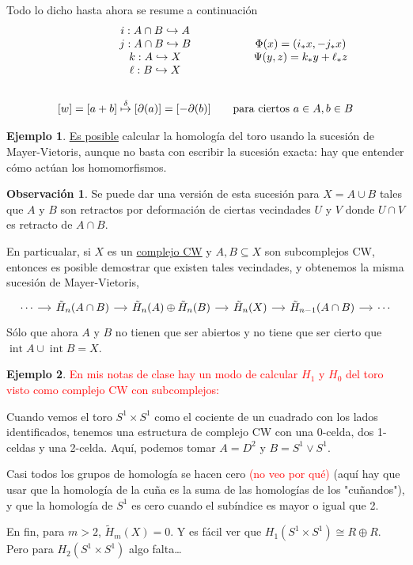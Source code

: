 \documentclass[spanish]{book}
\theoremstyle{definition}
\newtheorem*{obs}{Observación}
\newtheorem*{ejem}{Ejemplo}
\DeclareMathOperator{\Int}{int}
\begin{document}
	Todo lo dicho hasta ahora se resume a continuación
	\begin{equation*}
	\begin{aligned}
	\begin{array}{c@{\hspace{2cm}}c}
			i:A\cap B\hookrightarrow A\\
			j:A\cap B\hookrightarrow B &\Phi(x)=(i_*x,-j_*x)\\
			k:A\hookrightarrow X&\Psi(y,z)=k_*y+\ell_*z\\
			\ell:B\hookrightarrow X
	\end{array}\\ \\
	[w]=[a+b]\overset{\delta}{\mapsto}[\partial(a)]=[-\partial(b)]\qquad\text{para ciertos }a\in A,b\in B
	\end{aligned}
	\end{equation*}

	\begin{ejem}
		\href{https://math.stackexchange.com/questions/58311/the-homology-groups-of-t2-by-mayer-vietoris}{Es posible} calcular la homología del toro usando la sucesión de Mayer-Vietoris, aunque no basta con escribir la sucesión exacta: hay que entender cómo actúan los homomorfismos.
	\end{ejem}
	\begin{obs}
		Se puede dar una versión de esta sucesión para $X=A\cup B$ tales que $A$ y $B$ son retractos por deformación de ciertas vecindades $U$ y $V$ donde $U\cap V$ es retracto de $A\cap B$.
		
		En particualar, si $X$ es un \hyperref[chap:CCW]{complejo CW} y $A,B\subseteq X$ son subcomplejos CW, entonces es posible demostrar que existen tales vecindades, y obtenemos la misma sucesión de Mayer-Vietoris,
		\[\begin{tikzcd}[column sep= small]
			\cdots \arrow[r] & \tilde{H}_n(A\cap B) \arrow[r] & \tilde{H}_n(A) \oplus \tilde{H}_n(B) \arrow[r] & \tilde{H}_n(X) \arrow[r] & \tilde{H}_{n-1}(A\cap B) \arrow[r] &\cdots
		\end{tikzcd}\]
		Sólo que ahora $A$ y $B$ no tienen que ser abiertos y no tiene que ser cierto que $\Int A\cup\Int B=X$.
	\end{obs}
\begin{ejem}\label{ejem:toroCWMV}
	\textcolor{red}{En mis notas de clase hay un modo de calcular $H_1$ y $H_0$ del toro visto como complejo CW con subcomplejos:}
	
	Cuando vemos el toro $S^1\times S^1$ como el cociente de un cuadrado con los lados identificados, tenemos una estructura de complejo CW con una 0-celda, dos 1-celdas y una 2-celda. Aquí, podemos tomar $A=D^2$ y $B=S^1\vee S^1$.
	
	Casi todos los grupos de homología se hacen cero \textcolor{red}{(no veo por qué)} (aquí hay que usar que la homología de la cuña es la suma de las homologías de los "cuñandos"), y que la homología de $S^1$ es cero cuando el subíndice es mayor o igual que 2.
	
	En fin, para $m>2$, $\tilde H_m(X)=0$. Y es fácil ver que $H_1(S^1\times S^1)\cong R\oplus R$. Pero para $H_2(S^1\times S^1)$ algo falta…
	
\end{ejem}
\end{document}
